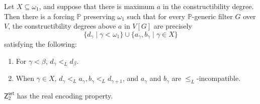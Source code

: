\documentclass[10pt,a4paper]{amsart}
\newcommand{\set}{\mathsf{set}}
\begin{document}
\begin{theorem}[Groszek] \label{Theorem: Groszek's theorem} \pushQED{\qed}
    Let $X\subseteq \omega_1$, and suppose that there is maximum $a$ in the constructibility degree. Then there is a forcing $\mathbb{P}$ preserving $\omega_1$ such that for every $\mathbb{P}$-generic filter $G$ over $V$, the constructibility degrees above $a$ in $V[G]$ are precisely
    \begin{equation*}
        \{d_\gamma\mid \gamma<\omega_1 \} \cup \{a_\gamma,b_\gamma\mid \gamma\in X\}
    \end{equation*}
    satisfying the following:
    \begin{enumerate}
        \item For $\gamma<\beta$, $d_\gamma <_L d_\beta$.
        \item When $\gamma\in X$, $d_\gamma <_L a_\gamma,b_\gamma<_L d_{\gamma+1}$, and $a_\gamma$ and $b_\gamma$ are $\le_L$-incompatible. \qedhere 
    \end{enumerate}
\end{theorem}

\begin{theorem} \label{Theorem: Real encoding property of Z2}
    $\mathsf{Z}_2^\set$ has the real encoding property.
\end{theorem}
\end{document}
